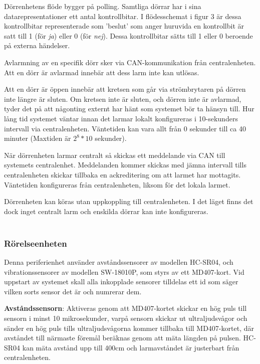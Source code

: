 \documentclass{article}
\begin{document}
Dörrenhetens flöde bygger på polling. Samtliga dörrar har i sina datarepresentationer ett antal kontrollbitar. I flödesschemat i figur 3 är dessa kontrollbitar representerade som 'beslut' som anger huruvida en kontrollbit är satt till 1 (för \textit{ja}) eller 0 (för \textit{nej}). Dessa kontrollbitar sätts till 1 eller 0 beroende på externa händelser.

Avlarmning av en specifik dörr sker via CAN-kommunikation från centralenheten. Att en dörr är avlarmad innebär att dess larm inte kan utlösas.

Att en dörr är öppen innebär att kretsen som går via strömbrytaren på dörren inte längre är sluten. Om kretsen inte är sluten, och dörren inte är avlarmad, tyder det på att någonting externt har hänt som systemet bör ta hänsyn till. Hur lång tid systemet väntar innan det larmar lokalt konfigureras i 10-sekunders intervall via centralenheten. Väntetiden kan vara allt från 0 sekunder till ca 40 minuter (Maxtiden är $2^8 *10$ sekunder).

När dörrenheten larmar centralt så skickas ett meddelande via CAN till systemets centralenhet. Meddelanden kommer skickas med jämna intervall tills centralenheten skickar tillbaka en ackreditering om att larmet har mottagits. Väntetiden konfigureras från centralenheten, liksom för det lokala larmet.

Dörrenheten kan köras utan uppkoppling till centralenheten. I det läget finns det dock inget centralt larm och enskilda dörrar kan inte konfigureras.\\ \\



\subsubsection{Rörelseenheten}
Denna periferienhet använder avståndssensorer av modellen HC-SR04, och vibrationssensorer av modellen SW-18010P, som styrs av ett MD407-kort.
Vid uppstart av systemet skall alla inkopplade sensorer tilldelas ett id som säger vilken sorts sensor det är och numrerar dem.

\textbf{Avståndssensorn}: Aktiveras genom att MD407-kortet skickar en hög puls till sensorn i minst 10 mikrosekunder, 
 varpå sensorn skickar ut ultraljudsvågor och sänder en hög puls tills ultraljudsvågorna kommer tillbaka till MD407-kortet, där avståndet till närmaste föremål beräknas genom att mäta längden på pulsen. 
HC-SR04 kan mäta avstånd upp till 400cm och larmavståndet är justerbart från centralenheten.
\end{document}
